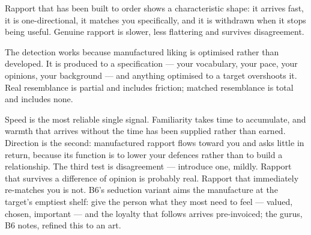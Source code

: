 


\begin{core}
Rapport that has been built to order shows a characteristic shape: it arrives fast, it is one-directional, it matches you specifically, and it is withdrawn when it stops being useful. Genuine rapport is slower, less flattering and survives disagreement.
\end{core}

\begin{mechanism}
The detection works because manufactured liking is optimised rather than developed. It is produced to a specification --- your vocabulary, your pace, your opinions, your background --- and anything optimised to a target overshoots it. Real resemblance is partial and includes friction; matched resemblance is total and includes none.

Speed is the most reliable single signal. Familiarity takes time to accumulate, and warmth that arrives without the time has been supplied rather than earned. Direction is the second: manufactured rapport flows toward you and asks little in return, because its function is to lower your defences rather than to build a relationship. The third test is disagreement --- introduce one, mildly. Rapport that survives a difference of opinion is probably real. Rapport that immediately re-matches you is not. B6's seduction variant aims the manufacture at the target's emptiest shelf: give the person what they most need to feel --- valued, chosen, important --- and the loyalty that follows arrives pre-invoiced; the gurus, B6 notes, refined this to an art.
\end{mechanism}

